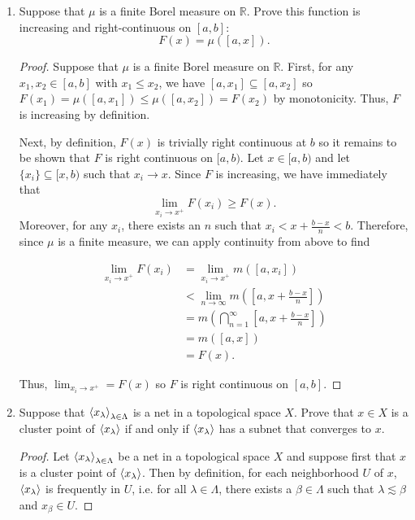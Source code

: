 \documentclass[11pt,oneside,english]{amsart}
\theoremstyle{definition}
\newcommand{\lom}[2]{\lim_{{#1}\rightarrow{#2}}}
\newcommand{\MB}[1]{\mathbb{#1}}
\def\<#1>{\mathinner{\langle#1\rangle}}
\begin{document}
\rightline{\today}



\vspace{5mm}
\begin{enumerate}
\itemsep7mm



\item Suppose that $\mu$ is a finite Borel measure on $\MB{R}$. Prove this function is increasing and right-continuous on $[a,b]$:
\[ F(x)=\mu([a,x]).\]


\begin{proof}
Suppose that $\mu$ is a finite Borel measure on $\MB{R}$. First, for any $x_1,x_2\in[a,b]$ with $x_1\leq x_2$, we have $[a,x_1]\subseteq[a,x_2]$ so $F(x_1)=\mu([a,x_1])\leq\mu([a,x_2])=F(x_2)$ by monotonicity. Thus, $F$ is increasing by definition.

Next, by definition, $F(x)$ is trivially right continuous at $b$ so it remains to be shown that $F$ is right continuous on $[a,b)$. Let $x\in[a,b)$ and let $\{x_i\}\subseteq[x,b)$ such that $x_i\rightarrow x$. Since $F$ is increasing, we have immediately that
\[
\lom{x_i}{x^+}F(x_i)\geq F(x).
\]
Moreover, for any $x_i$, there exists an $n$ such that $x_i< x+\frac{b-x}{n}<b$. Therefore, since $\mu$ is a finite measure, we can apply continuity from above to find

\begin{align*}
\lom{x_i}{x^+}F(x_i)&=\lom{x_i}{x^+}m([a,x_i])\\[2mm]
&<\lom{n}{\infty}m\left(\left[a,x+\frac{b-x}{n}\right]\right)\\[2mm]
&=m\left(\bigcap_{n=1}^\infty\left[a,x+\frac{b-x}{n}\right]\right)\\[2mm]
&=m([a,x])\\[2mm]
&=F(x).
\end{align*}

Thus, $\lom{x_i}{x^+}=F(x)$ so $F$ is right continuous on $[a,b]$.
\end{proof}

\pagebreak

\item Suppose that $\<x_\lambda>_{\lambda\in\Lambda}$ is a net in a topological space $X$. Prove that $x\in X$ is a cluster point of $\<x_\lambda>$ if and only if $\<x_\lambda>$ has a subnet that converges to $x$.

\begin{proof}
Let $\<x_\lambda>_{\lambda\in\Lambda}$ be a net in a topological space $X$ and suppose first that $x$ is a cluster point of $\<x_\lambda>$. Then by definition, for each neighborhood $U$ of $x$, $\<x_\lambda>$ is frequently in $U$, i.e. for all $\lambda\in\Lambda$, there exists a $\beta\in\Lambda$ such that $\lambda\lesssim \beta$ and $x_\beta\in U$.


\end{proof}
\end{enumerate}
\end{document}
